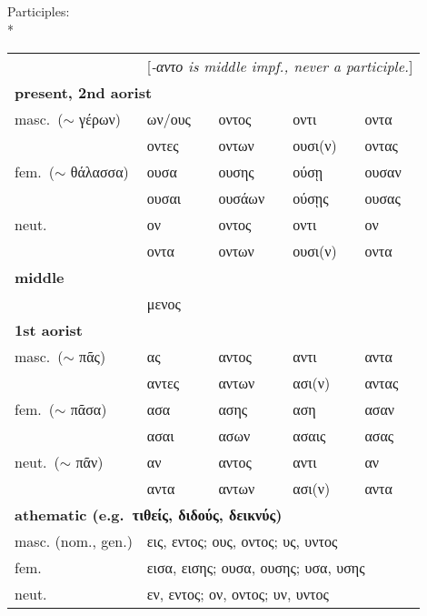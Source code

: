 \begin{small}
Participles:\\*
%
\begin{tabular}{lllll}
                          & \multicolumn{4}{l}{[\emph{-αντο is middle impf., never a participle.}]} \\
\multicolumn{5}{l}{\textbf{present, 2nd aorist}}\\
masc.~($\sim$ γέρων)      & ων\footnotemark[8]/ους & οντος  & οντι  & οντα      \\
                          & οντες  & οντων & ουσι(ν) & οντας \\
fem.~($\sim$ θάλασσα)     & ουσα   & ουσης & ούσῃ & ουσαν \\
                          & ουσαι  & ουσάων & ούσῃς & ουσας \\
neut.                     & ον     & οντος  & οντι  & ον \\
                          & οντα   & οντων  & ουσι(ν) & οντα \\
\multicolumn{5}{l}{\textbf{middle}}\\
                          & μενος \\
\multicolumn{5}{l}{\textbf{1st aorist}}\\
masc.~($\sim$ πᾶς)        & ας     & αντος  &αντι     & αντα \\
                          & αντες  & αντων  & ασι(ν)  & αντας \\
fem.~($\sim$ πᾶσα)        & ασα    & ασης   & αση     & ασαν \\
                          & ασαι   & ασων   & ασαις   & ασας \\
neut.~($\sim$ πᾶν)        & αν     & αντος  & αντι    & αν \\
                          & αντα   & αντων  & ασι(ν)  & αντα \\
\multicolumn{5}{l}{\textbf{athematic (e.g.~τιθείς, διδούς, δεικνύς)}}\\
masc. (nom., gen.)        &  \multicolumn{4}{l}{εις, εντος; ους, οντος; υς, υντος} \\
fem.                      &  \multicolumn{4}{l}{εισα, εισης; ουσα, ουσης; υσα, υσης} \\
neut.                     &  \multicolumn{4}{l}{εν, εντος; ον, οντος; υν, υντος} \\

\end{tabular}



\end{small}
